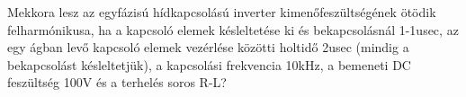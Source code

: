 \begin{example}

Mekkora lesz az egyfázisú hídkapcsolású inverter kimenőfeszültségének ötödik felharmónikusa, ha a kapcsoló elemek késleltetése ki és bekapcsolásnál 1-1usec, az egy ágban levő kapcsoló elemek vezérlése közötti holtidő 2usec (mindig a bekapcsolást késleltetjük), a kapcsolási frekvencia 10kHz, a bemeneti DC feszültség 100V és a terhelés soros R-L? 

\tcbline
\vspace{1mm}

\solution

\end{example}